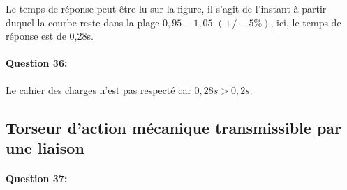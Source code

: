 Le temps de réponse peut être lu sur la figure, il s'agit de l'instant à partir duquel la courbe reste dans la plage $0,95-1,05$ $(+/-5\%)$, ici, le temps de réponse est de 0,28s.

\paragraph{Question 36:}

Le cahier des charges n'est pas respecté car $0,28s>0,2s$.

\newpage

\subsection{Torseur d'action mécanique transmissible par une liaison}

\paragraph{Question 37:}

